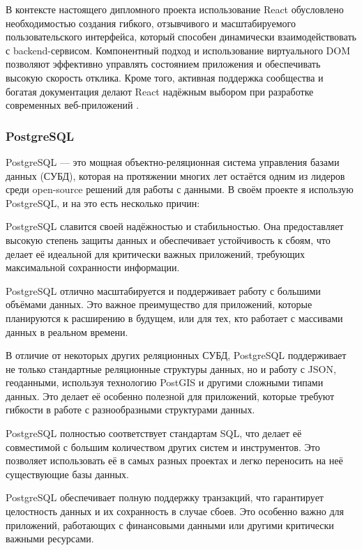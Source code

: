 \documentclass[diploma]{SCWorks}
\begin{document}
В контексте настоящего дипломного проекта использование React обусловлено 
необходимостью создания гибкого, отзывчивого и масштабируемого 
пользовательского интерфейса, который способен динамически взаимодействовать 
с backend-сервисом. Компонентный подход и использование виртуального DOM 
позволяют эффективно управлять состоянием приложения и обеспечивать высокую 
скорость отклика. Кроме того, активная поддержка сообщества и богатая 
документация делают React надёжным выбором при разработке современных 
веб-приложений \cite{react-docs,react-mdn}.

\subsubsection{PostgreSQL}

PostgreSQL — это мощная объектно-реляционная система управления 
базами данных (СУБД), которая на протяжении многих лет остаётся 
одним из лидеров среди open-source решений для работы с данными. 
В своём проекте я использую PostgreSQL, и на это есть несколько причин:

PostgreSQL славится своей надёжностью и стабильностью.
Она предоставляет высокую степень защиты данных и обеспечивает 
устойчивость к сбоям, что делает её идеальной для критически 
важных приложений, требующих максимальной сохранности информации.

PostgreSQL отлично масштабируется и поддерживает работу с большими
объёмами данных. Это важное преимущество для приложений, 
которые планируются к расширению в будущем, или для тех, кто 
работает с массивами данных в реальном времени.

В отличие от некоторых других реляционных СУБД, PostgreSQL
поддерживает не только стандартные реляционные структуры данных, 
но и работу с JSON, геоданными, используя технологию PostGIS 
и другими сложными типами данных. Это делает её особенно полезной 
для приложений, которые требуют гибкости в работе с 
разнообразными структурами данных.

PostgreSQL полностью соответствует стандартам SQL, что делает 
её совместимой с большим количеством других систем и инструментов. 
Это позволяет использовать её в самых разных проектах и легко 
переносить на неё существующие базы данных.

PostgreSQL обеспечивает полную поддержку транзакций, что гарантирует 
целостность данных и их сохранность в случае сбоев. Это особенно 
важно для приложений, работающих с финансовыми данными или 
другими критически важными ресурсами.
\end{document}
